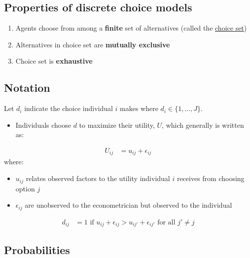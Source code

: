 \documentclass[11pt]{article}
\begin{document}
\subsection{Properties of discrete choice models}
\label{sec:org3f77fe8}

\begin{enumerate}
\item Agents choose from among a \textbf{finite} set of alternatives (called the \uline{choice set})

\item Alternatives in choice set are \textbf{mutually exclusive}

\item Choice set is \textbf{exhaustive}
\end{enumerate}

\subsection{Notation}
\label{sec:org2e52f5e}

Let \(d_i\) indicate the choice individual \(i\) makes where \(d_i\in\{1,\ldots, J\}\).

\begin{itemize}
\item Individuals choose \(d\) to maximize their utility, \(U\), which generally is written as:
\end{itemize}
\begin{align}
U_{ij}&=u_{ij}+\epsilon_{ij}
\end{align}
where:
\begin{itemize}
\item \(u_{ij}\) relates observed factors to the utility individual \(i\) receives from choosing option \(j\)
\item \(\epsilon_{ij}\) are unobserved to the econometrician but observed to the individual
\end{itemize}

\begin{align}
d_{ij}&=1 \text{  if  } u_{ij}+\epsilon_{ij}>u_{ij'}+\epsilon_{ij'}\text{  for all  } j'\neq j
\end{align}

\subsection{Probabilities}
\label{sec:org02f54c1}
\end{document}
